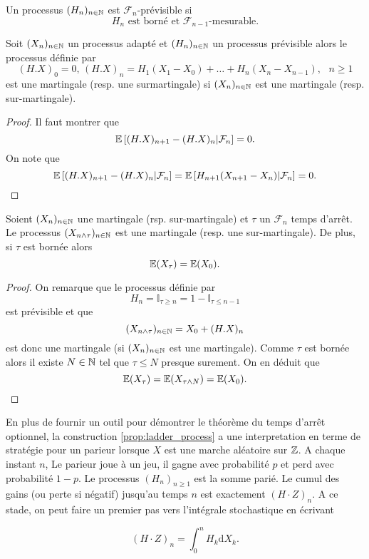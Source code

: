 \begin{definition}
Un processus $(H_n)_{n\in\mathbb{N}}$ est $\mathcal{F}_n$-prévisible si
$$
H_n\text{ est borné et }\mathcal{F}_{n-1}\text{-mesurable}.
$$
\end{definition}
\begin{prop}\label{prop:ladder_process}
Soit $(X_n)_{n\in\mathbb{N}}$ un processus adapté et $(H_n)_{n\in\mathbb{N}}$ un processus prévisible alors le processus définie par
$$
(H.X)_0 =0\text{, }(H.X)_n =H_1(X_1-X_0)+\ldots+ H_n(X_n-X_{n-1}),\text{ }n\geq1
$$
est une martingale (resp. une surmartingale) si $(X_n)_{n\in\mathbb{N}}$ est une martingale (resp. sur-martingale).
\end{prop}
\begin{proof}
Il faut montrer que
$$
\mathbb{E}\left[(H.X)_{n+1} - (H.X)_{n}|\mathcal{F}_n\right]=0.
$$
On note que
$$
\mathbb{E}\left[(H.X)_{n+1} - (H.X)_{n}|\mathcal{F}_n\right]=\mathbb{E}\left[H_{n+1}(X_{n+1}-X_n)|\mathcal{F}_n\right]=0.
$$
\end{proof}
\begin{theo}\label{theo:temps_arret}
Soient $(X_n)_{n\in\mathbb{N}}$ une martingale (rsp. sur-martingale) et $\tau$ un $\mathcal{F}_n$ temps d'arrêt. Le processus $(X_{n\land \tau})_{n\in\mathbb{N}}$ est une martingale (resp. une sur-martingale). De plus, si $\tau$ est bornée alors
$$
\mathbb{E}(X_{\tau}) = \mathbb{E}(X_0).
$$
\end{theo}
\begin{proof}
On remarque que le processus définie par
$$
H_{n} = \mathbb{I}_{\tau\geq n} = 1 -\mathbb{I}_{\tau\leq n-1}
$$
est prévisible et que
$$
(X_{n\land \tau})_{n\in\mathbb{N}} = X_0 + (H.X)_n
$$
est donc une martingale (si $(X_n)_{n\in\mathbb{N}}$ est une martingale). Comme $\tau$ est bornée alors il existe $N\in\mathbb{N}$ tel que $\tau\leq N$ presque surement. On en déduit que
$$
\mathbb{E}(X_{\tau})=\mathbb{E}(X_{\tau\land N})=\mathbb{E}(X_0).
$$
\end{proof}
\begin{remark}
En plus de fournir un outil pour démontrer le théorème du temps d'arrêt optionnel, la construction \cref{prop:ladder_process} a une interpretation en terme de stratégie pour un parieur lorsque $X$ est une marche aléatoire sur $\mathbb{Z}$. A chaque instant $n$, Le parieur joue à un jeu, il gagne avec probabilité $p$ et perd avec probabilité $1-p$. Le processus $(H_n)_{n\geq 1}$ est la somme parié. Le cumul des gains (ou perte si négatif) jusqu'au temps $n$ est exactement $(H\cdot Z)_n$. A ce stade, on peut faire un premier pas vers l'intégrale stochastique en écrivant 

 $$
 (H\cdot Z)_n = \int_0^n H_k\text{d}X_k.
 $$

\end{remark}
